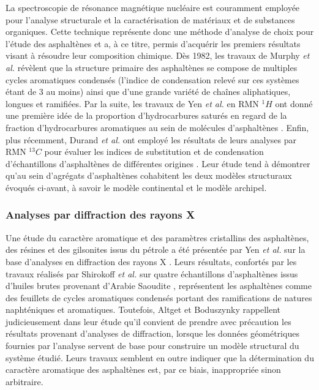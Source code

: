 \documentclass[12pt,a4paper]{book}
\begin{document}
La spectroscopie de résonance magnétique nucléaire est couramment employée pour l'analyse structurale et la caractérisation de matériaux et de substances organiques. 
Cette technique représente donc une méthode d'analyse de choix pour l'étude des asphaltènes et a, à ce titre, permis d'acquérir les premiers résultats visant à résoudre leur composition chimique. Dès 1982, les travaux de Murphy \textit{et al.} \cite{murphy1982determination} révèlent que la structure primaire des asphaltènes se compose de multiples cycles aromatiques condensés (l'indice de condensation relevé sur ces systèmes étant de 3 au moins) ainsi que d'une grande variété de chaînes aliphatiques, longues et ramifiées. Par la suite, les travaux de Yen \textit{et al.} en RMN $^{1}H$ ont donné une première idée de la proportion d'hydrocarbures saturés en regard de la fraction d'hydrocarbures aromatiques au sein de molécules d'asphaltènes  \cite{yen1984study}. Enfin, plus récemment, Durand \textit{et al.} ont employé les résultats de leurs analyses par RMN $^{13}C$ pour évaluer les indices de substitution et de condensation d'échantillons d'asphaltènes de différentes origines \cite{durand2010effect}. Leur étude tend à démontrer qu'au sein d'agrégats d'asphaltènes cohabitent les deux modèles structuraux évoqués ci-avant, à savoir le modèle continental et le modèle archipel. 


\subsubsection{Analyses par diffraction des rayons X}  

Une étude du caractère aromatique et des paramètres cristallins des asphaltènes, des résines et des gilsonites issus du pétrole a été présentée par Yen \textit{et al.} sur la base d'analyses en diffraction des rayons X \cite{yen1961investigation}. Leurs résultats, confortés par les travaux réalisés par Shirokoff \textit{et al.} sur quatre échantillons d'asphaltènes issus d'huiles brutes provenant d'Arabie Saoudite \cite{shirokoff1997characterization}, représentent les asphaltènes comme des feuillets de cycles aromatiques condensés portant des ramifications de natures naphténiques et aromatiques.
Toutefois, Altget et Boduszynky rappellent judicieusement dans leur étude \cite{altgeltcomposition} qu'il convient de prendre avec précaution les résultats provenant d'analyses de diffraction, lorsque les données géométriques fournies par l'analyse servent de base pour construire un modèle structural du système étudié. Leurs travaux semblent en outre indiquer que la détermination du caractère aromatique des asphaltènes est, par ce biais, inappropriée sinon arbitraire. 
\end{document}
